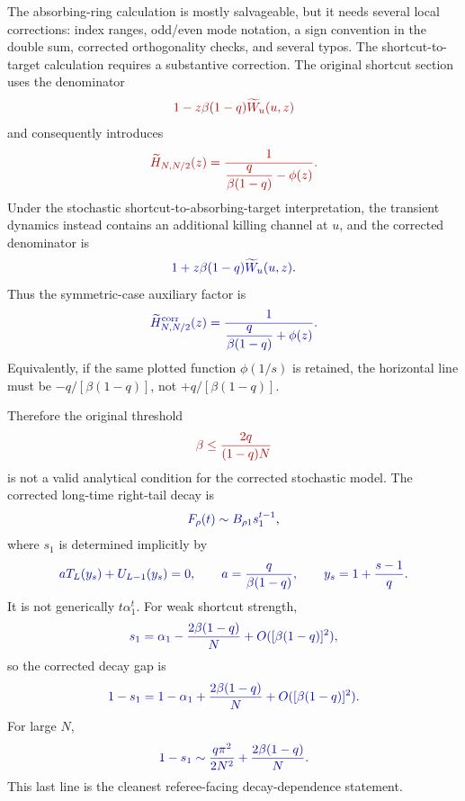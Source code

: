 \documentclass[11pt]{article}
\newcommand{\wt}{\widetilde}
\newcommand{\Original}[1]{\textcolor{red!70!black}{#1}}
\newcommand{\Corrected}[1]{\textcolor{blue!65!black}{#1}}
\begin{document}
The absorbing-ring calculation is mostly salvageable, but it needs several local corrections:
index ranges, odd/even mode notation, a sign convention in the double sum, corrected orthogonality
checks, and several typos.  The shortcut-to-target calculation requires a substantive correction.
The original shortcut section uses the denominator
\begin{equation}
  \Original{1-z\beta(1-q)\wt W_u(u,z)}
\end{equation}
and consequently introduces
\begin{equation}
  \Original{
  \wt H_{N,N/2}(z)=\frac{1}{\dfrac{q}{\beta(1-q)}-\phi(z)}.}
\end{equation}
Under the stochastic shortcut-to-absorbing-target interpretation, the transient dynamics instead
contains an additional killing channel at $u$, and the corrected denominator is
\begin{equation}
  \Corrected{1+z\beta(1-q)\wt W_u(u,z)}.
\end{equation}
Thus the symmetric-case auxiliary factor is
\begin{equation}
  \Corrected{
  \wt H^{\rm corr}_{N,N/2}(z)=\frac{1}{\dfrac{q}{\beta(1-q)}+\phi(z)}.}
\end{equation}
Equivalently, if the same plotted function $\phi(1/s)$ is retained, the horizontal line must be
$-q/[\beta(1-q)]$, not $+q/[\beta(1-q)]$.

Therefore the original threshold
\begin{equation}
  \Original{\beta\leq \frac{2q}{(1-q)N}}
\end{equation}
is not a valid analytical condition for the corrected stochastic model.  The corrected long-time
right-tail decay is
\begin{equation}
  \Corrected{F_\rho(t)\sim B_{\rho 1}s_1^{t-1}},
\end{equation}
where $s_1$ is determined implicitly by
\begin{equation}
  \Corrected{aT_L(y_s)+U_{L-1}(y_s)=0,
  \qquad a=\frac{q}{\beta(1-q)},\qquad y_s=1+\frac{s-1}{q}.}
\end{equation}
It is not generically $t\alpha_1^t$.  For weak shortcut strength,
\begin{equation}
  \Corrected{s_1=\alpha_1-\frac{2\beta(1-q)}{N}+O([\beta(1-q)]^2),}
\end{equation}
so the corrected decay gap is
\begin{equation}
  \Corrected{1-s_1=1-\alpha_1+\frac{2\beta(1-q)}{N}+O([\beta(1-q)]^2).}
\end{equation}
For large $N$,
\begin{equation}
  \Corrected{1-s_1\sim \frac{q\pi^2}{2N^2}+\frac{2\beta(1-q)}{N}.}
\end{equation}
This last line is the cleanest referee-facing decay-dependence statement.
\end{document}
